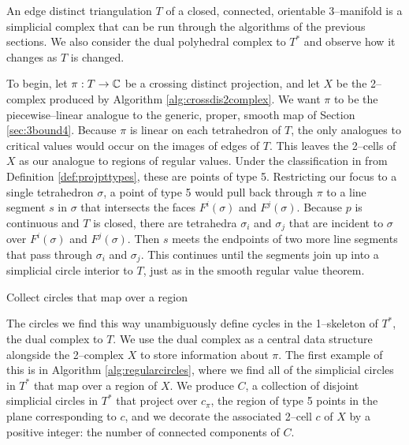 An edge distinct triangulation $T$ of a closed, connected, orientable 3--manifold is a simplicial complex that can be run through the algorithms of the previous sections.
We also consider the dual polyhedral complex to $T^*$ and observe how it changes as $T$ is changed.

To begin, let $\pi:T\to\mathbb{C}$ be a crossing distinct projection, and let $X$ be the 2--complex produced by Algorithm \ref{alg:crossdis2complex}.
We want $\pi$ to be the piecewise--linear analogue to the generic, proper, smooth map of Section \ref{sec:3bound4}.
Because $\pi$ is linear on each tetrahedron of $T$, the only analogues to critical values would occur on the images of edges of $T$.
This leaves the 2--cells of $X$ as our analogue to regions of regular values.
Under the classification in from Definition \ref{def:projpttypes}, these are points of type 5.
Restricting our focus to a single tetrahedron $\sigma$, a point of type 5 would pull back through $\pi$ to a line segment $s$ in $\sigma$ that intersects the faces $F^i(\sigma)$ and $F^j(\sigma)$.
Because $p$ is continuous and $T$ is closed, there are tetrahedra $\sigma_i$ and $\sigma_j$ that are incident to $\sigma$ over $F^i(\sigma)$ and $F^j(\sigma)$.
Then $s$ meets the endpoints of two more line segments that pass through $\sigma_i$ and $\sigma_j$.
This continues until the segments join up into a simplicial circle interior to $T$, just as in the smooth regular value theorem.

\begin{algorithm}[h]
	\caption{Collect circles that map over a region}
	\label{alg:regularcircles}
\end{algorithm}

The circles we find this way unambiguously define cycles in the 1--skeleton of $T^*$, the dual complex to $T$.
We use the dual complex as a central data structure alongside the 2--complex $X$ to store information about $\pi$.
The first example of this is in Algorithm \ref{alg:regularcircles}, where we find all of the simplicial circles in $T^*$ that map over a region of $X$.
We produce $C$, a collection of disjoint simplicial circles in $T^*$ that project over $c_\pi$, the region of type 5 points in the plane corresponding to $c$, and we decorate the associated 2--cell $c$ of $X$ by a positive integer: the number of connected components of $C$.


